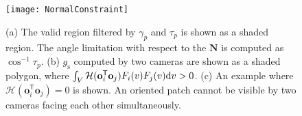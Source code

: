 \documentclass[10pt,twocolumn,letterpaper]{article}
\begin{document}
%
%
%
%
%


\begin{figure}[t]
\texttt{[image: NormalConstraint]}
\caption{(a) The valid region filtered by  $\gamma_p$ and $\tau_p$ is shown as a shaded region. The angle limitation with respect to the $\mathbf{N}$ is computed as $\cos^{-1}{\tau_p}$. (b) 
$g_\textrm{s}$ computed by two cameras are shown as a shaded polygon, where $\int_V \mathcal{H} (\mathbf{o}_i^{\mathsf{T}} \mathbf{o}_j) F_i(v) F_j(v) {\rm d}v >0$. (c) An example where $\mathcal{H} (\mathbf{o}_i^{\mathsf{T}} \mathbf{o}_j)=0$ is shown. An oriented patch cannot be visible by two cameras facing each other simultaneously.}
\label{fig:PatchRelationMRF}
\end{figure}
\end{document}
